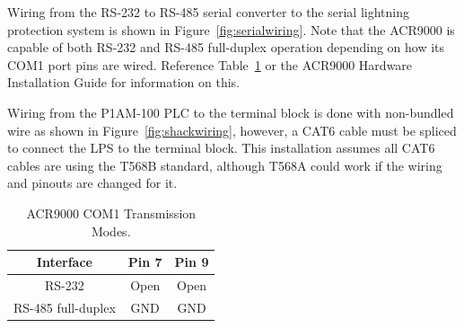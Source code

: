 \documentclass[titlepage]{article}
\begin{document}
Wiring from the RS-232 to RS-485 serial converter to the serial lightning protection system is shown in Figure~\ref{fig:serialwiring}. Note that the ACR9000 is capable of both RS-232 and RS-485 full-duplex operation depending on how its COM1 port pins are wired. Reference Table~\ref{tab:acr9000com1} or the ACR9000 Hardware Installation Guide for information on this.

Wiring from the P1AM-100 PLC to the terminal block is done with non-bundled wire as shown in Figure~\ref{fig:shackwiring}, however, a CAT6 cable must be spliced to connect the LPS to the terminal block. This installation assumes all CAT6 cables are using the T568B standard, although T568A could work if the wiring and pinouts are changed for it.

\begin{table}
  \begin{center}
    \begin{tabular}{c|c|c}
      Interface          & Pin 7 & Pin 9 \\ \hline
      RS-232             & Open  & Open  \\
      RS-485 full-duplex & GND   & GND   \\
    \end{tabular}
  \end{center}
  \caption{ACR9000 COM1 Transmission Modes.}\label{tab:acr9000com1}
\end{table}
\end{document}
